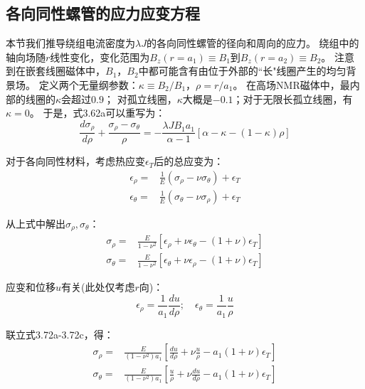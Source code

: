 \subsection{各向同性螺管的应力应变方程}
本节我们推导绕组电流密度为$\lambda J$的各向同性螺管的径向和周向的应力。
绕组中的轴向场随$r$线性变化，变化范围为$B_z(r = a_1)\equiv B_1$到$B_z(r = a_2)\equiv B_2$。
注意到在嵌套线圈磁体中，$B_1，B_2$中都可能含有由位于外部的``长"线圈产生的均匀背景场。
定义两个无量纲参数：$\kappa\equiv B_2/B_1，\rho = r/a_1$。
在高场NMR磁体中，最内部的线圈的$\kappa$会超过$0.9$；
对孤立线圈，$\kappa$大概是$-0.1$；对于无限长孤立线圈，有$\kappa=0$。
于是，式3.62a可以重写为：
\begin{equation}
\frac{d\sigma_{\rho}}{d\rho}+\frac{\sigma_\rho-\sigma_\theta}{\rho}=-\frac{\lambda JB_1a_1}{\alpha-1}[\alpha-\kappa-(1-\kappa)\rho]
\end{equation}

对于各向同性材料，考虑热应变$\epsilon_T$后的总应变为：
\begin{subequations}
	\begin{align}
\epsilon_\rho=&\frac{1}{E}(\sigma_\rho-\nu\sigma_\theta)+\epsilon_T\\
\epsilon_\theta=&\frac{1}{E}(\sigma_\theta-\nu\sigma_\rho)+\epsilon_T
	\end{align}
\end{subequations}

从上式中解出$\sigma_\rho,\sigma_{\theta}$：
\begin{subequations}
	\begin{align}
\sigma_\rho=&\frac{E}{1-\nu^2}[\epsilon_\rho+\nu\epsilon_\theta-(1+\nu)\epsilon_T]\\
\sigma_\theta=&\frac{E}{1-\nu^2}[\epsilon_\theta+\nu\epsilon_\rho-(1+\nu)\epsilon_T]
	\end{align}
\end{subequations}

应变和位移$u$有关(此处仅考虑$r$向)：
\begin{equation*}
\epsilon_\rho=\frac{1}{a_1}\frac{du}{d\rho};\quad \epsilon_\theta=\frac{1}{a_1}\frac{u}{\rho} \tag{3.72c}
\end{equation*}

联立式3.72a-3.72c，得：
\begin{align*}
\sigma_\rho=&\frac{E}{(1-\nu^2)a_1}\left[\frac{du}{d\rho}+\nu\frac{u}{\rho}-a_1(1+\nu)\epsilon_T\right]\tag{3.72d}\\ 
\sigma_\theta=&\frac{E}{(1-\nu^2)a_1}\left[\frac{u}{\rho}+\nu\frac{du}{d\rho}-a_1(1+\nu)\epsilon_T\right] \tag{3.72e}
\end{align*}

